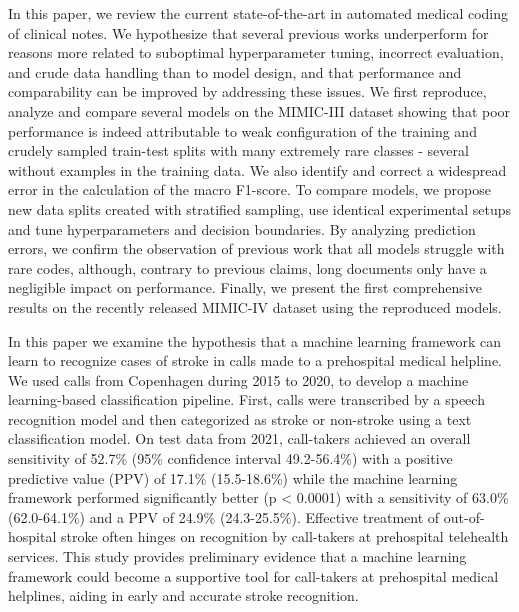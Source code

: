In this paper, we review the current state-of-the-art in automated medical coding of clinical notes. 
We hypothesize that several previous works underperform for reasons more related to suboptimal hyperparameter tuning, incorrect evaluation, and crude data handling than to model design, and that performance and comparability can be improved by addressing these issues. 
We first reproduce, analyze and compare several models on the MIMIC-III dataset showing that poor performance is indeed attributable to weak configuration of the training and crudely sampled train-test splits with many extremely rare classes - several without examples in the training data. 
We also identify and correct a widespread error in the calculation of the macro F1-score. 
To compare models, we propose new data splits created with stratified sampling, use identical experimental setups and tune hyperparameters and decision boundaries. 
By analyzing prediction errors, we confirm the observation of previous work that all models struggle with rare codes, although, contrary to previous claims, long documents only have a negligible impact on performance. 
Finally, we present the first comprehensive results on the recently released MIMIC-IV dataset using the reproduced models. 

In this paper we examine the hypothesis that a machine learning framework can learn to recognize cases of stroke in calls made to a prehospital medical helpline. 
We used calls from Copenhagen during 2015 to 2020, to develop a machine learning-based classification pipeline. First, calls were transcribed by a speech recognition model and then categorized as stroke or non-stroke using a text classification model.
On test data from 2021, call-takers achieved an overall sensitivity of 52.7\% (95\% confidence interval 49.2-56.4\%) with a positive predictive value (PPV) of 17.1\% (15.5-18.6\%) while the machine learning framework performed significantly better (p < 0.0001) with a sensitivity of 63.0\% (62.0-64.1\%) and a PPV of 24.9\% (24.3-25.5\%).
Effective treatment of out-of-hospital stroke often hinges on recognition by call-takers at prehospital telehealth services. 
This study provides preliminary evidence that a machine learning framework could become a supportive tool for call-takers at prehospital medical helplines, aiding in early and accurate stroke recognition.

